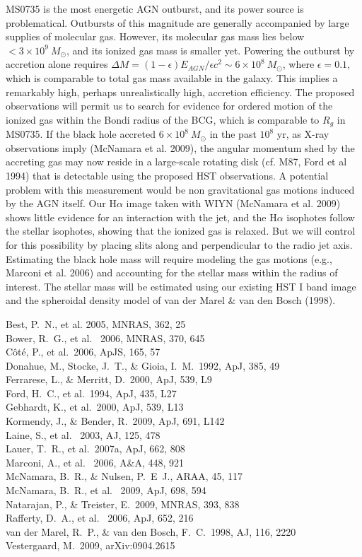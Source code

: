 \documentclass[12pt]{article}
\begin{document}
MS0735 is the most energetic AGN
outburst, and its power source is problematical.  Outbursts of this magnitude are generally accompanied by
large supplies of molecular gas.  However, its molecular gas mass lies below $<3\times 10^9~ M_\odot$, and its ionized
gas mass is smaller yet.  Powering
the outburst by accretion alone requires $\Delta M =(1-\epsilon)E_{AGN}/\epsilon c^2\sim 6\times 10^8~ M_\odot$, where
$\epsilon =0.1$, which is comparable to total gas mass available in the galaxy.  This implies a remarkably 
high, perhaps unrealistically high, accretion efficiency.   The
proposed observations will permit us to search for evidence for ordered motion of the ionized gas within the Bondi radius of
the BCG, which is comparable to $R_g$ in MS0735. If the black hole accreted   $6\times 10^8~ M_\odot$ in
the past $10^8$ yr, as X-ray observations imply (McNamara et al. 2009), the angular momentum shed by the accreting gas may now reside in 
a large-scale rotating disk (cf. M87, Ford et al 1994) that is detectable using the proposed HST observations. 
A potential problem with this measurement would be non gravitational gas motions induced by the AGN itself.  Our H$\alpha$ image taken with WIYN (McNamara et al. 2009) shows little evidence
for an interaction with the jet, and the H$\alpha$ isophotes follow the stellar isophotes, showing that the 
ionized gas is relaxed.   But we will control for this possibility by placing slits along and perpendicular to
the radio jet axis.  Estimating the black hole mass will require modeling the gas motions (e.g., Marconi et al. 2006) and accounting for the stellar
mass within the radius of interest.  The stellar mass will be estimated using our existing HST I band image and 
the spheroidal density model of van der Marel \& van den Bosch (1998). 

\noindent Best, P.~N., et al.  2005, MNRAS, 362, 25\\
Bower, R.~G., et al. \ 2006, MNRAS, 370, 645 \\
C{\^o}t{\'e}, P., et al.\ 2006, ApJS, 165, 57 \\
Donahue, M., Stocke, J.~T., \& Gioia, I.~M.\ 1992, ApJ, 385, 49 \\
Ferrarese, L., \& Merritt, D.\ 2000, ApJ, 539, L9 \\
Ford, H.~C., et al.\ 1994, ApJ, 435, L27 \\
Gebhardt, K., et al.\ 2000, ApJ, 539, L13 \\
Kormendy, J., \& Bender, R.\ 2009, ApJ, 691, L142 \\
Laine, S., et al. \ 2003, AJ, 125, 478\\
Lauer, T.~R., et al.\ 2007a, ApJ, 662, 808 \\
Marconi, A., et al. \ 2006, A\&A, 448, 921 \\
McNamara, B.~R., \& Nulsen, P.~E~J., ARAA, 45, 117 \\
McNamara, B.~R., et al. \ 2009, ApJ, 698, 594 \\
Natarajan, P., \& Treister, E.\ 2009, MNRAS, 393, 838 \\
Rafferty, D.~A., et al. \ 2006, ApJ, 652, 216 \\
van der Marel, R.~P., \& van den Bosch, F.~C.\ 1998, AJ, 116, 2220 \\
Vestergaard, M.\ 2009, arXiv:0904.2615
\end{document}
